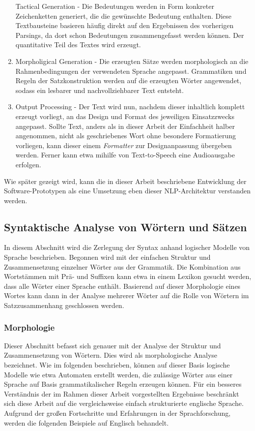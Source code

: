 \documentclass[12pt]{report}
\begin{document}
\begin{enumerate}
Tactical Generation - Die Bedeutungen werden in Form konkreter Zeichenketten generiert, die die gewünschte Bedeutung enthalten. Diese Textbausteine basieren häufig direkt auf den Ergebnissen des vorherigen Parsings, da dort schon Bedeutungen zusammengefasst werden können. Der quantitative Teil des Textes wird erzeugt.
\item
Morpholigical Generation - Die erzeugten Sätze werden morphologisch an die Rahmenbedingungen der verwendeten Sprache angepasst. Grammatiken und Regeln der Satzkonstruktion werden auf die erzeugten Wörter angewendet, sodass ein lesbarer und nachvollziehbarer Text entsteht.
\item
Output Processing - Der Text wird nun, nachdem dieser inhaltlich komplett erzeugt vorliegt, an das Design und Format des jeweiligen Einsatzzwecks angepasst. Sollte Text, anders als in dieser Arbeit der Einfachheit halber angenommen, nicht als geschriebenes Wort ohne besondere Formatierung vorliegen, kann dieser einem \textit{Formatter} zur Designanpassung übergeben werden. Ferner kann etwa mihilfe von Text-to-Speech eine Audioausgabe erfolgen. 
\end{enumerate}

Wie später gezeigt wird, kann die in dieser Arbeit beschriebene Entwicklung der Software-Prototypen als eine Umsetzung eben dieser NLP-Architektur verstanden werden.

\subsection[Syntaktische Analyse]{Syntaktische Analyse von Wörtern und Sätzen}
In diesem Abschnitt wird die Zerlegung der Syntax anhand logischer Modelle von Sprache beschrieben. Begonnen wird mit der einfachen Struktur und Zusammensetzung einzelner Wörter aus der Grammatik. Die Kombination aus Wortstämmen mit Prä- und Suffixen kann etwa in einem Lexikon gesucht werden, dass alle Wörter einer Sprache enthält.  Basierend auf dieser Morphologie eines Wortes kann dann in der Analyse mehrerer Wörter auf die Rolle von Wörtern im Satzzusammenhang geschlossen werden. 

\subsubsection{Morphologie}
Dieser Abschnitt befasst sich genauer mit der Analyse der Struktur und Zusammensetzung von Wörtern. Dies wird als morphologische Analyse bezeichnet. Wie im folgenden beschrieben, können auf dieser Basis logische Modelle wie etwa Automaten erstellt werden, die zulässige Wörter aus einer Sprache auf Basis grammatikalischer Regeln erzeugen können. Für ein besseres Verständnis der im Rahmen dieser Arbeit vorgestellten Ergebnisse beschränkt sich diese Arbeit auf die vergleichsweise einfach strukturierte englische Sprache. Aufgrund der großen Fortschritte und Erfahrungen in der Sprachforschung, werden die folgenden Beispiele auf Englisch behandelt.
\end{document}
